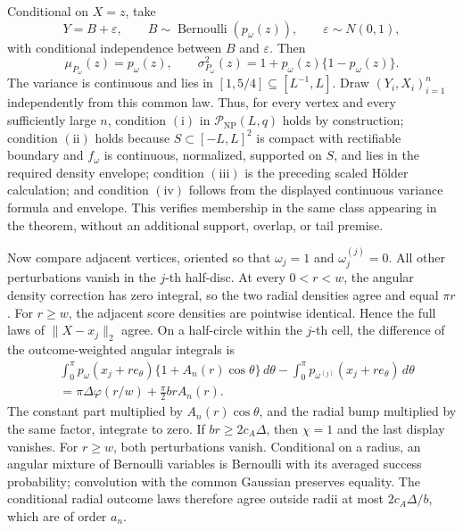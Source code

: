 Conditional on \(X=z\), take
\[
 Y=B+\varepsilon,
 \qquad
 B\sim\operatorname{Bernoulli}(p_\omega(z)),
 \qquad
 \varepsilon\sim N(0,1),
\]
with conditional independence between \(B\) and \(\varepsilon\).  Then
\[
 \mu_{P_\omega}(z)=p_\omega(z),
 \qquad
 \sigma_{P_\omega}^2(z)=1+p_\omega(z)\{1-p_\omega(z)\}.
\]
The variance is continuous and lies in \([1,5/4]\subseteq[L^{-1},L]\).  Draw \((Y_i,X_i)_{i=1}^n\) independently from this common law.  Thus, for every vertex and every sufficiently large \(n\), condition \(\mathrm{(i)}\) in \(\mathcal P_{\mathrm{NP}}(L,q)\) holds by construction; condition \(\mathrm{(ii)}\) holds because \(S\subset[-L,L]^2\) is compact with rectifiable boundary and \(f_\omega\) is continuous, normalized, supported on \(S\), and lies in the required density envelope; condition \(\mathrm{(iii)}\) is the preceding scaled H\"older calculation; and condition \(\mathrm{(iv)}\) follows from the displayed continuous variance formula and envelope.  This verifies membership in the same class appearing in the theorem, without an additional support, overlap, or tail premise.

Now compare adjacent vertices, oriented so that \(\omega_j=1\) and \(\omega_j^{(j)}=0\).  All other perturbations vanish in the \(j\)-th half-disc.  At every \(0<r<w\), the angular density correction has zero integral, so the two radial densities agree and equal \(\pi r\).  For \(r\geq w\), the adjacent score densities are pointwise identical.  Hence the full laws of \(\lVert X-x_j\rVert_2\) agree.  On a half-circle within the \(j\)-th cell, the difference of the outcome-weighted angular integrals is
\[
\begin{aligned}
 &\int_0^\pi p_\omega(x_j+re_\theta)
 \{1+A_n(r)\cos\theta\}\,d\theta
 -\int_0^\pi p_{\omega^{(j)}}(x_j+re_\theta)\,d\theta\\
 &=\pi\Delta\varphi(r/w)+\frac\pi2brA_n(r).
\end{aligned}
\]
The constant part multiplied by \(A_n(r)\cos\theta\), and the radial bump multiplied by the same factor, integrate to zero.  If \(br\geq2c_A\Delta\), then \(\chi=1\) and the last display vanishes.  For \(r\geq w\), both perturbations vanish.  Conditional on a radius, an angular mixture of Bernoulli variables is Bernoulli with its averaged success probability; convolution with the common Gaussian preserves equality.  The conditional radial outcome laws therefore agree outside radii at most \(2c_A\Delta/b\), which are of order \(a_n\).

